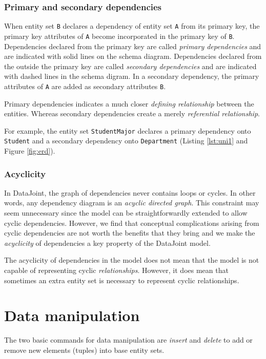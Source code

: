 \documentclass[letter,10pt]{article}
\newcommand{\datajoint}{DataJoint\xspace}
\begin{document}
\subsubsection{Primary and secondary dependencies}
When entity set \lstinline$B$ declares a dependency of entity set \lstinline$A$ from its primary key, the primary key attributes of \lstinline$A$ become incorporated in the primary key of \lstinline$B$.  
Dependencies declared from the primary key are called \emph{primary dependencies} and are indicated with solid lines on the schema diagram. 
Dependencies declared from the outside the primary key are called \emph{secondary dependencies} and are indicated with dashed lines in the schema digram.  
In a secondary dependency, the primary attributes of \lstinline$A$ are added as secondary attributes \lstinline$B$. 

Primary dependencies indicates a much closer \emph{defining relationship} between the entities. Whereas secondary dependencies create a merely \emph{referential relationship}.

For example, the entity set \lstinline$StudentMajor$ declares a primary dependency onto \lstinline$Student$ and a secondary dependency onto \lstinline$Department$ (Listing \ref{lst:uni1} and Figure \ref{fig:erd}).


\subsubsection{Acyclicity}
In \datajoint, the graph of dependencies never contains loops or cycles.  
In other words, any dependency diagram is an \emph{acyclic directed graph}.
This constraint may seem unnecessary since the model can be straightforwardly extended to allow cyclic dependencies. 
However, we find that conceptual complications arising from cyclic dependencies are not worth the benefits that they bring and we make the \emph{acyclicity} of dependencies a key property of the \datajoint model.

The acyclicity of dependencies in the model does not mean that the model is not capable of representing cyclic \emph{relationships}. 
However, it does mean that sometimes an extra entity set is necessary to represent cyclic relationships. 

\section{Data manipulation}\label{sec:manip}
The two basic commands for data manipulation are \emph{insert} and \emph{delete} to add or remove new elements (tuples) into base entity sets.
\end{document}
